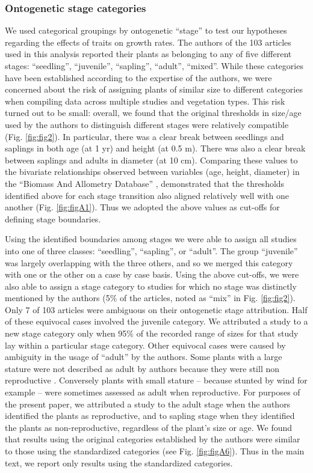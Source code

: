 \documentclass[a4paper,11pt]{article}
\begin{document}
\subsubsection*{Ontogenetic stage categories}

We used categorical groupings by ontogenetic ``stage'' to test our hypotheses regarding the effects of traits on growth rates. The authors of the 103 articles used in this analysis reported their plants as belonging to any of five different stages: ``seedling'', ``juvenile'', ``sapling'', ``adult'', ``mixed''. While these categories have been established according to the expertise of the authors, we were concerned about the risk of assigning plants of similar size to different categories when compiling data across multiple studies and vegetation types. This risk turned out to be small: overall, we found that the original thresholds in size/age used by the authors to distinguish different stages were relatively compatible (Fig. \ref{fig:fig2}). In particular, there was a clear break between seedlings and saplings in both age (at 1 yr) and height (at 0.5 m). There was also a clear break between saplings and adults in diameter (at 10 cm). Comparing these values to the bivariate relationships observed between variables (age, height, diameter) in the ``Biomass And Allometry Database'' \citep{Falster:2015}, demonstrated that the thresholds identified above for each stage transition also aligned relatively well with one another (Fig. \ref{fig:figA1}). Thus we adopted the above values as cut-offs for defining stage boundaries.

Using the identified boundaries among stages we were able to assign all studies into one of three classes: ``seedling'', ``sapling'', or ``adult''. The group ``juvenile'' was largely overlapping with the three others, and so we merged this category with one or the other on a case by case basis. Using the above cut-offs, we were also able to assign a stage category to studies for which no stage was distinctly mentioned by the authors (5\% of the articles, noted as ``mix'' in Fig. \ref{fig:fig2}). Only 7 of 103 articles were ambiguous on their ontogenetic stage attribution. Half of these equivocal cases involved the juvenile category. We attributed a study to a new stage category only when 95\% of the recorded range of sizes for that study lay within a particular stage category. Other equivocal cases were caused by ambiguity in the usage of ``adult'' by the authors. Some plants with a large stature were not described as adult by authors because they were still non reproductive \citep{King:2006he}. Conversely plants with small stature -- because stunted by wind for example \citep{Stratton:2001ck} -- were sometimes assessed as adult when reproductive. For purposes of the present paper, we attributed a study to the adult stage when the authors identified the plants as reproductive, and to sapling stage when they identified the plants as non-reproductive, regardless of the plant's size or age. We found that results using the original categories established by the authors were similar to those using the standardized categories (see Fig. \ref{fig:figA6}).  Thus in the main text, we report only results using the standardized categories.
\end{document}
